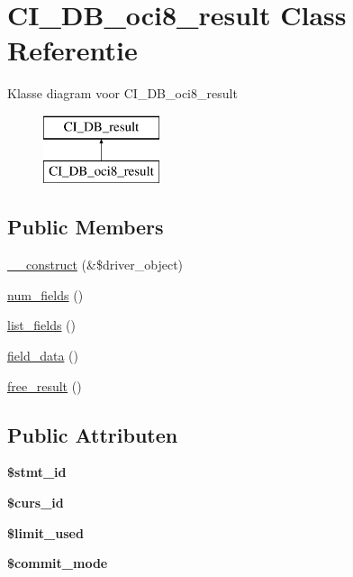 \hypertarget{class_c_i___d_b__oci8__result}{}\section{C\+I\+\_\+\+D\+B\+\_\+oci8\+\_\+result Class Referentie}
\label{class_c_i___d_b__oci8__result}
Klasse diagram voor C\+I\+\_\+\+D\+B\+\_\+oci8\+\_\+result\begin{figure}[H]
\begin{center}
\leavevmode
\includegraphics[height=2.000000cm]{class_c_i___d_b__oci8__result}
\end{center}
\end{figure}
\subsection*{Public Members}
\begin{DoxyCompactItemize}
\item 
\mbox{\hyperlink{class_c_i___d_b__oci8__result_a8e093c8b6e5733bc3f306385ee426ab7}{\+\_\+\+\_\+construct}} (\&\$driver\+\_\+object)
\item 
\mbox{\hyperlink{class_c_i___d_b__oci8__result_af831bf363e4d7d661a717a4932af449d}{num\+\_\+fields}} ()
\item 
\mbox{\hyperlink{class_c_i___d_b__oci8__result_a50b54eb4ea7cfd039740f532988ea776}{list\+\_\+fields}} ()
\item 
\mbox{\hyperlink{class_c_i___d_b__oci8__result_a84bffd65e53902ade1591716749a33e3}{field\+\_\+data}} ()
\item 
\mbox{\hyperlink{class_c_i___d_b__oci8__result_aad2d98d6beb3d6095405356c6107b473}{free\+\_\+result}} ()
\end{DoxyCompactItemize}
\subsection*{Public Attributen}
\begin{DoxyCompactItemize}
\item 
\mbox{\label{class_c_i___d_b__oci8__result_a1a97f17fd259cd27c73b65e6c3706ec0}} 
{\bfseries \$stmt\+\_\+id}
\item 
\mbox{\label{class_c_i___d_b__oci8__result_a75e7d18ad2e68ace3813533c9da2e179}} 
{\bfseries \$curs\+\_\+id}
\item 
\mbox{\label{class_c_i___d_b__oci8__result_a96df35d7e3e76bef21ebb80234fe59e8}} 
{\bfseries \$limit\+\_\+used}
\item 
\mbox{\label{class_c_i___d_b__oci8__result_a9b3b7163763603c5a0bcdfd819ae074d}} 
{\bfseries \$commit\+\_\+mode}
\end{DoxyCompactItemize}

